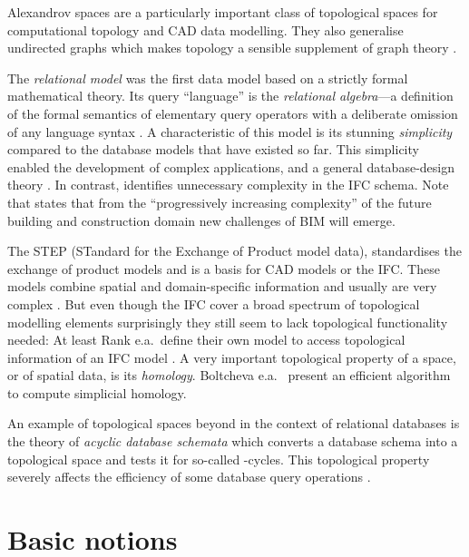 \documentclass[5p]{elsarticle}
\newcommand{\qq}[1]{``#1''}
\begin{document}
Alexandrov spaces \cite{Alexandroff} are a particularly important class of 
topological spaces for computational topology \cite{Arenas:AlexandroffSpaces} 
and CAD data modelling. 
They also generalise undirected graphs which makes topology a sensible supplement of graph 
theory \cite{Vella:GraphTheoryIsTopology}. 

The \emph{relational model} \cite{Codd:RelationalModel} was the first data model based on 
a strictly formal mathematical theory. Its query \qq{language} is the 
\emph{relational algebra}---a definition of the formal semantics of elementary 
query operators with a deliberate omission of any language syntax 
\cite[p.\ 21]{Codd:RelationalModel}. A characteristic of this model is its 
stunning \emph{simplicity} compared to the database models that have existed so far. 
This simplicity enabled the development of complex applications, and 
a general database-design theory \cite{Codd:DataModels}. 
In contrast, \cite{Amor:BIM2007} identifies unnecessary complexity in the IFC schema.  
Note that \cite{Watson:Challenges} states that from the \qq{progressively increasing complexity} 
of the future building and construction domain new challenges of BIM will emerge. 



The STEP (STandard for the Exchange of Product model data), standardises the exchange of 
product models \cite{Aug95, Eas99} and is a basis for CAD models or the IFC\@. 
These models combine spatial and domain-specific information and usually are very complex 
\cite{Amor:BIM2007, Eas99}. But even though the IFC cover a broad spectrum of 
topological modelling elements \cite{Paul-2010} surprisingly they still seem to lack topological 
functionality needed: At least Rank e.a.\ define their own model to 
access topological information of an IFC model \cite{SPP1103:RankEtAl}. 
A very important topological property of a space, or of spatial data, is its 
\emph{homology}. Boltcheva e.a.\ \cite{Boltcheva:Homology} present an efficient algorithm to 
compute simplicial homology. 

An example of topological spaces beyond  in the context of relational databases 
is the theory of \emph{acyclic database schemata} which converts a database schema into a 
topological space and tests it for so-called -cycles. 
This topological property severely affects the efficiency of some database query 
operations \cite{Fagin:acyclicdatabase}. 


\section{Basic notions}\label{sec:basics}
\end{document}
